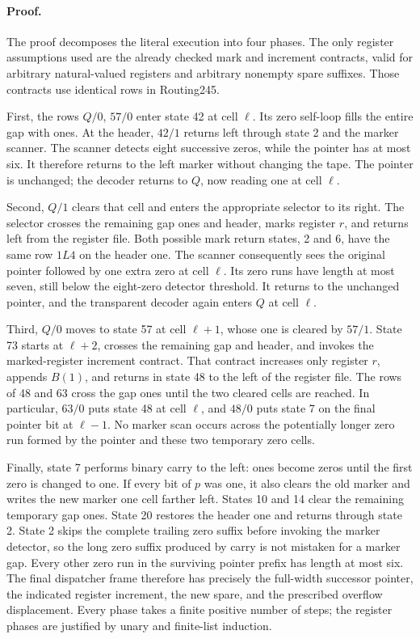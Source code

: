 \paragraph{Proof.}
The proof decomposes the literal execution into four phases. The only
register assumptions used are the already checked mark and increment
contracts, valid for arbitrary natural-valued registers and arbitrary
nonempty spare suffixes. Those contracts use identical rows in Routing245.

First, the rows $Q/0$, $57/0$ enter state 42 at cell $\ell$. Its zero
self-loop fills the entire gap with ones. At the header, $42/1$ returns
left through state 2 and the marker scanner. The scanner detects eight
successive zeros, while the pointer has at most six. It therefore returns
to the left marker without changing the tape. The pointer is unchanged;
the decoder returns to $Q$, now reading one at cell $\ell$.

Second, $Q/1$ clears that cell and enters the appropriate selector to its
right. The selector crosses the remaining gap ones and header, marks
register $r$, and returns left from the register file. Both possible mark
return states, 2 and 6, have the same row $1L4$ on the header one. The
scanner consequently sees the original pointer followed by one extra zero
at cell $\ell$. Its zero runs have length at most seven, still below the
eight-zero detector threshold. It returns to the unchanged pointer, and
the transparent decoder again enters $Q$ at cell $\ell$.

Third, $Q/0$ moves to state 57 at cell $\ell+1$, whose one is cleared by
$57/1$. State 73 starts at $\ell+2$, crosses the remaining gap and header,
and invokes the marked-register increment contract. That contract increases
only register $r$, appends $B(1)$, and returns in state 48 to the left of
the register file. The rows of 48 and 63 cross the gap ones until the two
cleared cells are reached. In particular, $63/0$ puts state 48 at cell
$\ell$, and $48/0$ puts state 7 on the final pointer bit at $\ell-1$.
No marker scan occurs across the potentially longer zero run formed by the
pointer and these two temporary zero cells.

Finally, state 7 performs binary carry to the left: ones become zeros until
the first zero is changed to one. If every bit of $p$ was one, it also
clears the old marker and writes the new marker one cell farther left.
States 10 and 14 clear the remaining temporary gap ones. State 20 restores
the header one and returns through state 2. State 2 skips the complete
trailing zero suffix before invoking the marker detector, so the long zero
suffix produced by carry is not mistaken for a marker gap. Every other
zero run in the surviving pointer prefix has length at most six. The final
dispatcher frame therefore has precisely the full-width successor pointer,
the indicated register increment, the new spare, and the prescribed
overflow displacement. Every phase takes a finite positive number of
steps; the register phases are justified by unary and finite-list induction.

